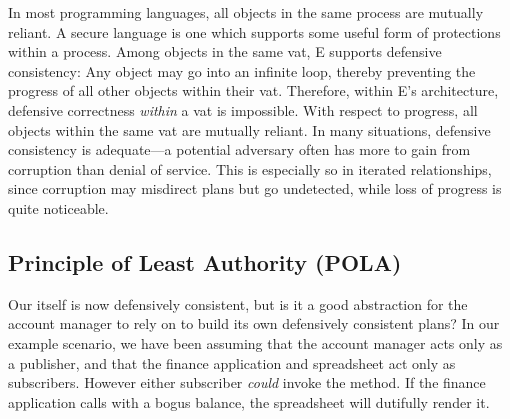 \documentclass{llncs}
\begin{document}
In most programming languages, all objects in the same process are
mutually reliant. A secure language is one which supports some useful
form of protections within a process.  Among objects in the same vat,
E supports defensive consistency: Any object may go into an infinite
loop, thereby preventing the progress of all other objects within
their vat. Therefore, within E's architecture, defensive correctness
\emph{within} a vat is impossible. With respect to progress, all
objects within the same vat are mutually reliant. In many situations,
defensive consistency is adequate---a potential adversary often has
more to gain from corruption than denial of service. This is
especially so in iterated relationships, since corruption may
misdirect plans but go undetected, while loss of progress is quite
noticeable.

\subsection{Principle of Least Authority (POLA)}

Our  itself is now defensively consistent, but is
it a good abstraction for the account manager to rely on to build its
own defensively consistent plans? In our example scenario, we have
been assuming that the account manager acts only as a publisher, and
that the finance application and spreadsheet act only as
subscribers. However either subscriber \emph{could} invoke the
 method. If the finance application calls
 with a bogus balance, the spreadsheet will dutifully
render it.
\end{document}

